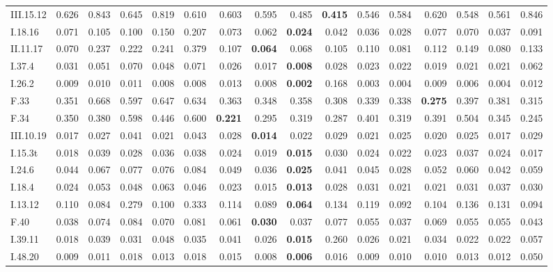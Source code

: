 \begin{table}[!htbp]
\begin{tabular}{lrrrrrrrrrrrrrrr}
III.15.12 & 0.626 & 0.843 & 0.645 & 0.819 & 0.610 & 0.603 & 0.595 & 0.485 & \textbf{0.415} & 0.546 & 0.584 & 0.620 & 0.548 & 0.561 & 0.846 \\
I.18.16 & 0.071 & 0.105 & 0.100 & 0.150 & 0.207 & 0.073 & 0.062 & \textbf{0.024} & 0.042 & 0.036 & 0.028 & 0.077 & 0.070 & 0.037 & 0.091 \\
II.11.17 & 0.070 & 0.237 & 0.222 & 0.241 & 0.379 & 0.107 & \textbf{0.064} & 0.068 & 0.105 & 0.110 & 0.081 & 0.112 & 0.149 & 0.080 & 0.133 \\
I.37.4 & 0.031 & 0.051 & 0.070 & 0.048 & 0.071 & 0.026 & 0.017 & \textbf{0.008} & 0.028 & 0.023 & 0.022 & 0.019 & 0.021 & 0.021 & 0.062 \\
I.26.2 & 0.009 & 0.010 & 0.011 & 0.008 & 0.008 & 0.013 & 0.008 & \textbf{0.002} & 0.168 & 0.003 & 0.004 & 0.009 & 0.006 & 0.004 & 0.012 \\
F.33 & 0.351 & 0.668 & 0.597 & 0.647 & 0.634 & 0.363 & 0.348 & 0.358 & 0.308 & 0.339 & 0.338 & \textbf{0.275} & 0.397 & 0.381 & 0.315 \\
F.34 & 0.350 & 0.380 & 0.598 & 0.446 & 0.600 & \textbf{0.221} & 0.295 & 0.319 & 0.287 & 0.401 & 0.319 & 0.391 & 0.504 & 0.345 & 0.245 \\
III.10.19 & 0.017 & 0.027 & 0.041 & 0.021 & 0.043 & 0.028 & \textbf{0.014} & 0.022 & 0.029 & 0.021 & 0.025 & 0.020 & 0.025 & 0.017 & 0.029 \\
I.15.3t & 0.018 & 0.039 & 0.028 & 0.036 & 0.038 & 0.024 & 0.019 & \textbf{0.015} & 0.030 & 0.024 & 0.022 & 0.023 & 0.037 & 0.024 & 0.017 \\
I.24.6 & 0.044 & 0.067 & 0.077 & 0.076 & 0.084 & 0.049 & 0.036 & \textbf{0.025} & 0.041 & 0.045 & 0.028 & 0.052 & 0.060 & 0.042 & 0.059 \\
I.18.4 & 0.024 & 0.053 & 0.048 & 0.063 & 0.046 & 0.023 & 0.015 & \textbf{0.013} & 0.028 & 0.031 & 0.021 & 0.021 & 0.031 & 0.037 & 0.030 \\
I.13.12 & 0.110 & 0.084 & 0.279 & 0.100 & 0.333 & 0.114 & 0.089 & \textbf{0.064} & 0.134 & 0.119 & 0.092 & 0.104 & 0.136 & 0.131 & 0.094 \\
F.40 & 0.038 & 0.074 & 0.084 & 0.070 & 0.081 & 0.061 & \textbf{0.030} & 0.037 & 0.077 & 0.055 & 0.037 & 0.069 & 0.055 & 0.055 & 0.043 \\
I.39.11 & 0.018 & 0.039 & 0.031 & 0.048 & 0.035 & 0.041 & 0.026 & \textbf{0.015} & 0.260 & 0.026 & 0.021 & 0.034 & 0.022 & 0.022 & 0.057 \\
I.48.20 & 0.009 & 0.011 & 0.018 & 0.013 & 0.018 & 0.015 & 0.008 & \textbf{0.006} & 0.016 & 0.009 & 0.010 & 0.010 & 0.013 & 0.012 & 0.050 \\

\end{tabular}
\end{table}
